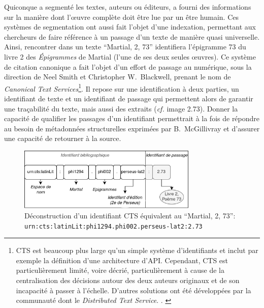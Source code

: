 Quiconque a segmenté les textes, auteurs ou éditeurs, a fourni des informations sur la manière dont l'œuvre complète doit être lue par un être humain. Ces systèmes de segmentation ont aussi fait l'objet d'une indexation, permettant aux chercheurs de faire référence à un passage d'un texte de manière quasi universelle. Ainsi, rencontrer dans un texte \enquote{Martial, 2, 73} identifiera l'épigramme 73 du livre 2 des \textit{Épigrammes} de Martial (l'une de ses deux seules œuvres). Ce système de citation canonique a fait l'objet d'un effort de passage au numérique, sous la direction de Neel Smith et Christopher W.~Blackwell, prenant le nom de \textit{Canonical Text Services}\footnote{CTS est beaucoup plus large qu'un simple système d'identifiants et inclut par exemple la définition d'une architecture d'API. Cependant, CTS est particulièrement limité, voire décrié, particulièrement à cause de la centralisation des décisions autour des deux auteurs originaux et de son incapacité à passer à l'échelle. D'autres solutions ont été développées par la communauté dont le \textit{Distributed Text Service}. \textcite{blackwell2019cite}. \textcite{almas_distributed_2021}}. Il repose sur une identification à deux parties, un identifiant de texte et un identifiant de passage qui permettent alors de garantir une traçabilité du texte, mais aussi des extraits (\textit{cf.} image 2.73). Donner la capacité de qualifier les passages d'un identifiant permettrait à la fois de répondre au besoin de métadonnées structurelles exprimées par B.~McGillivray et d'assurer une capacité de retourner à la source.

\begin{figure}
    \centering
    \includegraphics[height=3cm]{figures/chap1/part2/cts-urn.drawio.png}
    \caption{Déconstruction d'un identifiant CTS équivalent au \enquote{Martial, 2, 73}: \texttt{urn:cts:latinLit:phi1294.phi002.perseus-lat2:2.73}}
    \label{fig:chap1:cts_urn}
\end{figure}


